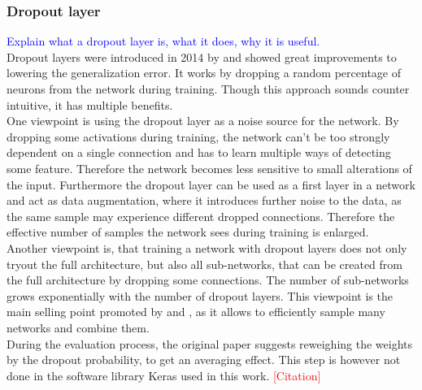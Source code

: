 \subsubsection{Dropout layer}
\textcolor{blue}{Explain what a dropout layer is, what it does, why it is useful.}\\
Dropout layers were introduced in 2014 by \cite{dropout_invention} and showed great improvements to lowering the generalization error. It works by dropping a random percentage of neurons from the network during training. Though this approach sounds counter intuitive, it has multiple benefits.\\
One viewpoint is using the dropout layer as a noise source for the network. By dropping some activations during training, the network can't be too strongly dependent on a single connection and has to learn multiple ways of detecting some feature. Therefore the network becomes less sensitive to small alterations of the input. Furthermore the dropout layer can be used as a first layer in a network and act as data augmentation, where it introduces further noise to the data, as  the same sample may experience different dropped connections. Therefore the effective number of samples the network sees during training is enlarged.\\
Another viewpoint is, that training a network with dropout layers does not only tryout the full architecture, but also all sub-networks, that can be created from the full architecture by dropping some connections. The number of sub-networks grows exponentially with the number of dropout layers. This viewpoint is the main selling point promoted by \cite{deep_learning_book} and \cite{dropout_invention}, as it allows to efficiently sample many networks and combine them.\\
During the evaluation process, the original paper \cite{dropout_invention} suggests reweighing the weights by the dropout probability, to get an averaging effect. This step is however not done in the software library Keras used in this work. \textcolor{red}{[Citation]}
